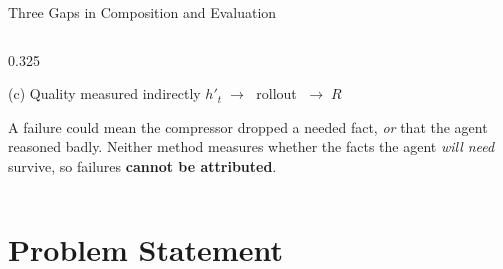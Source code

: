 \documentclass[usenames,dvipsnames,aspectratio=169,10pt]{beamer}
\begin{document}
\begin{frame}{Three Gaps in Composition and Evaluation}
\begin{columns}[T]
\begin{column}{0.325\textwidth}
\begin{alertblock}{(c) Quality measured indirectly}
\centering
$h'_t \;\rightarrow\;$ rollout $\;\rightarrow\; R$
\vspace{0.1cm}

\raggedright
A failure could mean the compressor dropped a needed fact, \emph{or} that the
agent reasoned badly. Neither method measures whether the facts the agent
\emph{will need} survive, so failures \textbf{cannot be attributed}.
\end{alertblock}
\end{column}
\end{columns}
\end{frame}

\section{Problem Statement}
\end{document}
